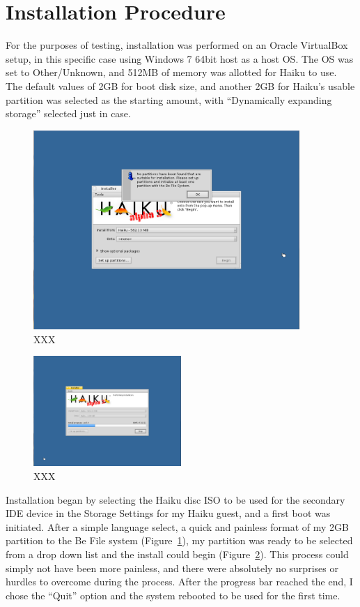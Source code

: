 \documentclass{article}
\newcommand{\figref}[1]{Figure~\ref{fig:#1}}
\begin{document}
\section{Installation Procedure}

For the purposes of testing, installation was performed on an Oracle
VirtualBox setup, in this specific case using Windows 7 64bit host as
a host OS.  The OS was set to Other/Unknown, and 512MB of memory was
allotted for Haiku to use.  The default values of 2GB for boot disk
size, and another 2GB for Haiku’s usable partition was selected as the
starting amount, with ``Dynamically expanding storage'' selected just
in case.

\begin{figure}[h]
\centering
\includegraphics[width=0.9\textwidth]{figs/install-partition.png}
\caption{XXX}
\label{fig:install-partition}
\end{figure}

\begin{figure}[h]
\centering
\includegraphics[width=0.5\textwidth]{figs/install-progress.png}
\caption{XXX}
\label{fig:install-progress}
\end{figure}

Installation began by selecting the Haiku disc ISO to be used for the
secondary IDE device in the Storage Settings for my Haiku guest, and a
first boot was initiated.  After a simple language select, a quick and
painless format of my 2GB partition to the Be File system
(\figref{install-partition}), my partition was ready to be selected
from a drop down list and the install could begin
(\figref{install-progress}).  This process could simply not have been
more painless, and there were absolutely no surprises or hurdles to
overcome during the process.  After the progress bar reached the end,
I chose the ``Quit'' option and the system rebooted to be used for the
first time.
\end{document}
